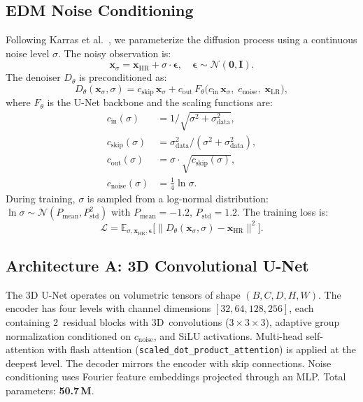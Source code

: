 \documentclass[10pt,journal]{IEEEtran}
\begin{document}
\subsection{EDM Noise Conditioning}

Following Karras et al.~\cite{b18}, we parameterize the diffusion
process using a continuous noise level $\sigma$.  The noisy
observation is:
\begin{equation}\label{eq:noisy}
  \mathbf{x}_\sigma = \mathbf{x}_\text{HR}
    + \sigma \cdot \boldsymbol{\epsilon},
  \quad \boldsymbol{\epsilon} \sim \mathcal{N}(\mathbf{0}, \mathbf{I}).
\end{equation}
The denoiser $D_\theta$ is preconditioned as:
\begin{equation}\label{eq:precond}
  D_\theta(\mathbf{x}_\sigma, \sigma)
  = c_\text{skip}\,\mathbf{x}_\sigma
    + c_\text{out}\,F_\theta\!\bigl(
        c_\text{in}\,\mathbf{x}_\sigma,\;
        c_\text{noise},\;
        \mathbf{x}_\text{LR}
      \bigr),
\end{equation}
where $F_\theta$ is the U-Net backbone and the scaling functions are:
\begin{align}
  c_\text{in}(\sigma)   &= 1/\sqrt{\sigma^2 + \sigma_\text{data}^2}, \\
  c_\text{skip}(\sigma) &= \sigma_\text{data}^2 / (\sigma^2 + \sigma_\text{data}^2), \\
  c_\text{out}(\sigma)  &= \sigma \cdot \sqrt{c_\text{skip}(\sigma)}, \\
  c_\text{noise}(\sigma)&= \tfrac{1}{4}\ln\sigma.
\end{align}
During training, $\sigma$ is sampled from a log-normal distribution:
$\ln\sigma \sim \mathcal{N}(P_\text{mean}, P_\text{std}^2)$ with $P_\text{mean} = -1.2$, $P_\text{std} = 1.2$.
The training loss is:
\begin{equation}\label{eq:loss}
  \mathcal{L} = \mathbb{E}_{\sigma, \mathbf{x}_\text{HR}, \boldsymbol{\epsilon}}
    \bigl[
      \|D_\theta(\mathbf{x}_\sigma, \sigma) - \mathbf{x}_\text{HR}\|^2
    \bigr].
\end{equation}

\subsection{Architecture A: 3D Convolutional U-Net}

The 3D U-Net operates on volumetric tensors of shape
$(B, C, D, H, W)$.  The encoder has four levels with channel dimensions
$[32, 64, 128, 256]$, each containing 2~residual blocks with
3D~convolutions ($3\!\times\!3\!\times\!3$), adaptive group normalization
conditioned on $c_\text{noise}$, and SiLU activations.  Multi-head
self-attention with flash attention (\texttt{scaled\_dot\_product\_attention})
is applied at the deepest level.  The decoder mirrors the encoder with
skip connections.  Noise conditioning uses Fourier feature embeddings
projected through an MLP.  Total parameters: \textbf{50.7\,M}.
\end{document}
